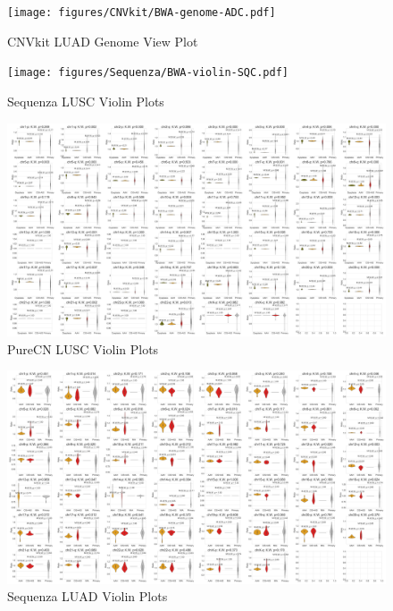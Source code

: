 \documentclass[11pt,a4paper,onecolumn,oneside]{report}
\begin{document}
                \begin{figure}[p]
                    \centering
                    \texttt{[image: figures/CNVkit/BWA-genome-ADC.pdf]}
                    \caption{CNVkit LUAD Genome View Plot}
                    \label{fig:cnvkit-ADC-genome}
                \end{figure}

                \begin{figure}[p]
                    \centering
                    \texttt{[image: figures/Sequenza/BWA-violin-SQC.pdf]}
                    \caption{Sequenza LUSC Violin Plots}
                    \label{fig:sequenza-SQC-violin}
                \end{figure}

                \begin{figure}[p]
                    \centering
                    \includegraphics[width=\linewidth]{figures/PureCN/BWA-violin-SQC.pdf}
                    \caption{PureCN LUSC Violin Plots}
                    \label{fig:PureCN-SQC-violin}
                \end{figure}

                \begin{figure}[p]
                    \centering
                    \includegraphics[width=\linewidth]{figures/Sequenza/BWA-violin-ADC.pdf}
                    \caption{Sequenza LUAD Violin Plots}
                    \label{fig:sequenza-ADC-violin}
                \end{figure}
\end{document}
